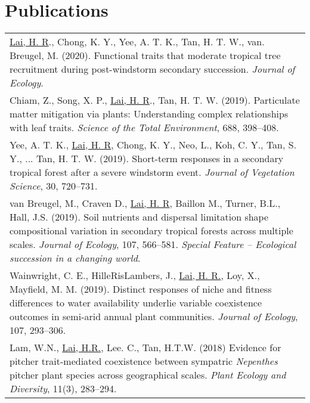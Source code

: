 \documentclass[a4paper]{article}
\begin{document}
\section*{Publications}

\begin{tabular}{p{\linewidth}}

\hangindent=1cm \underline{Lai, H. R}., Chong, K. Y., Yee, A. T. K., Tan, H. T. W., van. Breugel, M. (2020). Functional traits that moderate tropical tree recruitment during post-windstorm secondary succession. \textit{Journal of Ecology}. \\

\hangindent=1cm Chiam, Z., Song, X. P., \underline{Lai, H. R}., Tan, H. T. W. (2019). Particulate matter mitigation via plants: Understanding complex relationships with leaf traits. \textit{Science of the Total Environment}, 688, 398--408.\\

\hangindent=1cm Yee, A. T. K., \underline{Lai, H. R}, Chong, K. Y., Neo, L., Koh, C. Y., Tan, S. Y., ... Tan, H. T. W. (2019). Short-term responses in a secondary tropical forest after a severe windstorm event. \textit{Journal of Vegetation Science}, 30, 720--731. \\

\hangindent=1cm van Breugel, M., Craven D., \underline{Lai, H. R}, Baillon M., Turner, B.L., Hall, J.S. (2019). Soil nutrients and dispersal limitation shape compositional variation in secondary tropical forests across multiple scales. \textit{Journal of Ecology}, 107, 566--581. \textit{Special Feature -- Ecological succession in a changing world}.\\

\hangindent=1cm Wainwright, C. E., HilleRisLambers, J., \underline{Lai, H. R.}, Loy, X., Mayfield, M. M. (2019). Distinct responses of niche and fitness differences to water availability underlie variable coexistence outcomes in semi-arid annual plant communities. \textit{Journal of Ecology}, 107, 293--306.\\

\hangindent=1cm Lam, W.N., \underline{Lai, H.R.}, Lee. C., Tan, H.T.W. (2018) Evidence for pitcher trait-mediated coexistence between sympatric \textit{Nepenthes} pitcher plant species across geographical scales. \textit{Plant Ecology and Diversity}, 11(3), 283--294.\\


\end{tabular}
\end{document}
